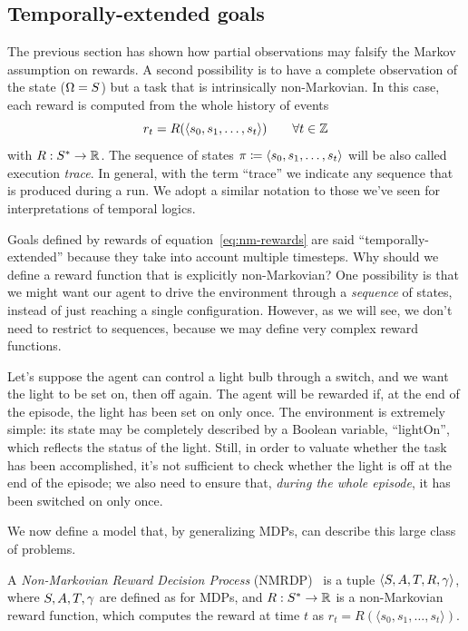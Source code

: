 \subsection{Temporally-extended goals}

\label{sec:tempoal-goals}

The previous section has shown how partial observations may falsify the Markov
assumption on rewards. A second possibility is to have a complete observation
of the state ($\Omega = S$) but a task that is intrinsically
non-Markovian. In this case, each reward is computed from the whole history
of events
\begin{equation}
	r_t = R(\langle s_0, s_1, \dots, s_t \rangle) \qquad \forall t \in \mathbb{Z}
	\label{eq:nm-rewards}
\end{equation}
with $R: S^* \to \mathbb{R}$. The sequence of states $\pi
\coloneqq \langle s_0, s_1, \dots, s_t \rangle$ will be also called
execution \emph{trace}. In general, with the term ``trace'' we indicate any
sequence that is produced during a run. We adopt a similar notation to those
we've seen for interpretations of temporal logics.

Goals defined by rewards of equation~\eqref{eq:nm-rewards} are said
``temporally-extended'' because they take into account multiple timesteps. Why
should we define a reward function that is explicitly non-Markovian? One
possibility is that we might want our agent to drive the environment through a
\emph{sequence} of states, instead of just reaching a single configuration.
However, as we will see, we don't need to restrict to sequences, because we
may define very complex reward functions.

\begin{example}
	Let's suppose the agent can control a light bulb through a switch, and we
	want the light to be set on, then off again. The agent will be rewarded if,
	at the end of the episode, the light has been set on only once.  The
	environment is extremely simple: its state may be completely described by a
	Boolean variable, ``lightOn'', which reflects the status of the light.
	Still, in order to valuate whether the task has been accomplished, it's not
	sufficient to check whether the light is off at the end of the episode; we
	also need to ensure that, \emph{during the whole episode}, it has been
	switched on only once.
\end{example}

We now define a model that, by generalizing MDPs, can describe this large
class of problems.
\begin{definition}
	A \emph{Non-Markovian Reward Decision Process}
	(NMRDP)~\cite{bib:nmrdp-logic-first} is a tuple $\langle S, A, T, R,
	\gamma \rangle$, where $S, A, T, \gamma$ are defined as for
	MDPs, and $R: S^* \to \mathbb{R}$ is a non-Markovian reward function, which
	computes the reward at time $t$ as $r_t = R(\langle s_0, s_1, \dots, s_t
	\rangle)$.
\end{definition}

